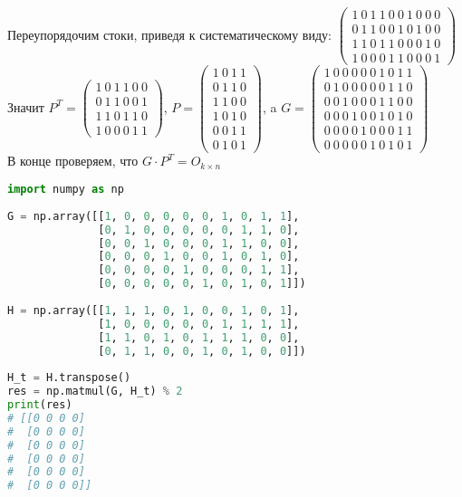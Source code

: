\documentclass[fontsize=14pt]{article}
\begin{document}
	Переупорядочим стоки, приведя к систематическому виду:
	$
	 \begin{pmatrix}
	 	1\ 0\ 1\ 1\ 0\ 0\ 1\ 0\ 0\ 0\\
	 	0\ 1\ 1\ 0\ 0\ 1\ 0\ 1\ 0\ 0\\
	 	1\ 1\ 0\ 1\ 1\ 0\ 0\ 0\ 1\ 0\\
		1\ 0\ 0\ 0\ 1\ 1\ 0\ 0\ 0\ 1		
	\end{pmatrix}
	$
	Значит $P^T = 
	 \begin{pmatrix}
	 	1\ 0\ 1\ 1\ 0\ 0\\
	 	0\ 1\ 1\ 0\ 0\ 1\\
	 	1\ 1\ 0\ 1\ 1\ 0\\
		1\ 0\ 0\ 0\ 1\ 1		
	\end{pmatrix}
	$,
	$P =
	 \begin{pmatrix}
		1\ 0\ 1\ 1\\
		0\ 1\ 1\ 0\\
		1\ 1\ 0\ 0\\
		1\ 0\ 1\ 0\\
		0\ 0\ 1\ 1\\
		0\ 1\ 0\ 1	
	\end{pmatrix}$, a
	$	G = 
	\begin{pmatrix}
		1\ 0\ 0\ 0\ 0\ 0\ 1\ 0\ 1\ 1\\
		0\ 1\ 0\ 0\ 0\ 0\ 0\ 1\ 1\ 0\\
		0\ 0\ 1\ 0\ 0\ 0\ 1\ 1\ 0\ 0\\
		0\ 0\ 0\ 1\ 0\ 0\ 1\ 0\ 1\ 0\\
		0\ 0\ 0\ 0\ 1\ 0\ 0\ 0\ 1\ 1\\
		0\ 0\ 0\ 0\ 0\ 1\ 0\ 1\ 0\ 1	
	\end{pmatrix}
	$\\
	
	В конце проверяем, что $G \cdot P^T = O_{k \times n}$
	
\begin{lstlisting}[frame=single, language=Python]
import numpy as np
 
G = np.array([[1, 0, 0, 0, 0, 0, 1, 0, 1, 1],
              [0, 1, 0, 0, 0, 0, 0, 1, 1, 0],
              [0, 0, 1, 0, 0, 0, 1, 1, 0, 0],
              [0, 0, 0, 1, 0, 0, 1, 0, 1, 0],
              [0, 0, 0, 0, 1, 0, 0, 0, 1, 1],
              [0, 0, 0, 0, 0, 1, 0, 1, 0, 1]])
 
H = np.array([[1, 1, 1, 0, 1, 0, 0, 1, 0, 1],
              [1, 0, 0, 0, 0, 0, 1, 1, 1, 1],
              [1, 1, 0, 1, 0, 1, 1, 1, 0, 0],
              [0, 1, 1, 0, 0, 1, 0, 1, 0, 0]])
 
H_t = H.transpose()
res = np.matmul(G, H_t) % 2
print(res)
# [[0 0 0 0]
#  [0 0 0 0]
#  [0 0 0 0]
#  [0 0 0 0]
#  [0 0 0 0]
#  [0 0 0 0]]	
\end{lstlisting}
\end{document}
